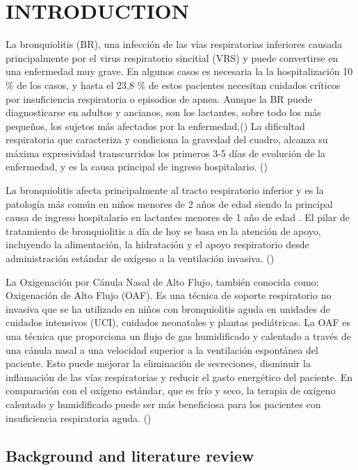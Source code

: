 \section{INTRODUCTION} \label{sec:itroduction}

La bronquiolitis (BR), una infección de las vías respiratorias inferiores causada principalmente por el virus respiratorio sincitial (VRS) y puede convertirse en una enfermedad muy grave. En algunos casos es necesaria la la hospitalización
10 \% de los casos, y hasta el 23,8 \% de estos pacientes necesitan cuidados críticos por insuficiencia respiratoria o episodios de apnea. Aunque la BR puede diagnosticarse en adultos y ancianos, son los lactantes, sobre todo los más pequeños, los sujetos más afectados por la enfermedad.(\cite{Fainardi2021}) La dificultad respiratoria que caracteriza y condiciona la gravedad del cuadro, alcanza su máxima expresividad transcurridos los primeros 3-5 días de evolución de la enfermedad, y es la causa principal de ingreso hospitalario. (\cite{Patel2003})

La bronquiolitis afecta principalmente al tracto respiratorio inferior y es la patología más común en niños menores de 2 años de edad siendo la principal causa de ingreso hospitalario en lactantes menores de 1 año de edad . El pilar de tratamiento de bronquiolitis a día de hoy se basa en la atención de apoyo, incluyendo la alimentación, la hidratación y el apoyo respiratorio desde administración estándar de oxígeno a la ventilación invasiva. (\cite{Daverio2019})

La Oxigenación por Cánula Nasal de Alto Flujo, también conocida como: Oxigenación de Alto Flujo (OAF). Es una técnica de soporte respiratorio no invasiva que se ha utilizado en niños con bronquiolitis aguda en unidades de cuidados intensivos (UCI), cuidados neonatales y plantas pediátricas. La OAF es una técnica que proporciona un flujo de gas humidificado y calentado a través de una cánula nasal a una velocidad superior a la ventilación espontánea del paciente. Esto puede mejorar la eliminación de secreciones, disminuir la inflamación de las vías respiratorias y reducir el gasto energético del paciente. En comparación con el oxígeno estándar, que es frío y seco, la terapia de oxígeno calentado y humidificado puede ser más beneficiosa para los pacientes con insuficiencia respiratoria aguda. (\cite{Daverio2019})


\subsection{Background and literature review}

